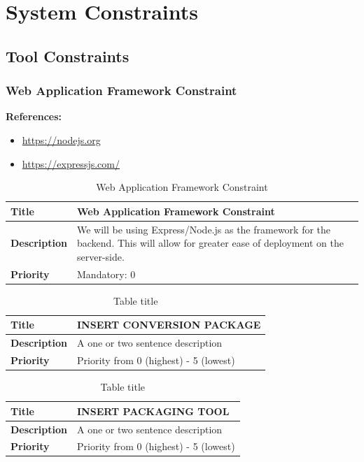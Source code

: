 \documentclass{article}
\begin{document}
\pagebreak

\section{System Constraints}

\subsection{Tool Constraints}

\subsubsection{Web Application Framework Constraint}

\textbf{References:}
\begin{itemize}
	\item \url{https://nodejs.org}
	\item \url{https://expressjs.com/}
\end{itemize}

\begin{table}[H]
	\caption{Web Application Framework Constraint}
	\begin{tabularx}{\textwidth}{|l|X|}
		\hline
		\textbf{Title}       & Web Application Framework Constraint              \\ \hline
		\textbf{Description} & We will be using Express/Node.js as the framework
		for the backend. This will allow for greater ease of deployment on the
		server-side. \\ \hline
		\textbf{Priority}    & Mandatory: 0                                      \\ \hline
	\end{tabularx}
\end{table}

\begin{table}[H]
	\caption{Table title}
	\begin{tabularx}{\textwidth}{|l|X|}
		\hline
		\textbf{Title}       & INSERT CONVERSION PACKAGE              \\ \hline
		\textbf{Description} & A one or two sentence description      \\ \hline
		\textbf{Priority}    & Priority from 0 (highest) - 5 (lowest) \\ \hline
	\end{tabularx}
\end{table}

\begin{table}[H]
	\caption{Table title}
	\begin{tabularx}{\textwidth}{|l|X|}
		\hline
		\textbf{Title}       & INSERT PACKAGING TOOL                  \\ \hline
		\textbf{Description} & A one or two sentence description      \\ \hline
		\textbf{Priority}    & Priority from 0 (highest) - 5 (lowest) \\ \hline
	\end{tabularx}
\end{table}
\end{document}
